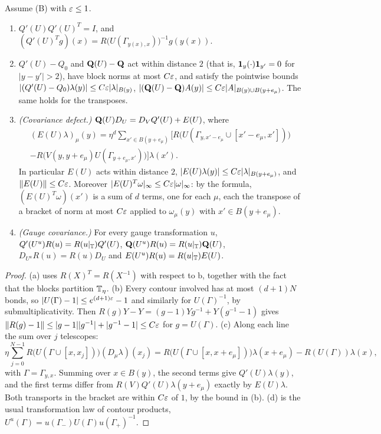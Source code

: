 \begin{lemma}\label{lem:cov-avg}
Assume (B) with $\varepsilon\le1$.
\begin{enumerate}[label=(\alph*)]
\item $Q'(U)Q'(U)^T=I$, and $(Q'(U)^Tg)(x)=R\big(U(\Gamma_{y(x),x})\big)^{-1}g(y(x))$.
\item $Q'(U)-Q_0$ and $\mathbf Q(U)-\mathbf Q$ act within distance $2$ (that is, $\mathbf 1_y(\cdot)\mathbf 1_{y'}=0$ for $|y-y'|>2$), have block norms at most $C\varepsilon$, and satisfy the pointwise bounds $|(Q'(U)-Q_0)\lambda(y)|\le C\varepsilon|\lambda|_{B(y)}$, $|(\mathbf Q(U)-\mathbf Q)A(y)|\le C\varepsilon|A|_{B(y)\cup B(y+e_\mu)}$. The same holds for the transposes.
\item \emph{(Covariance defect.)} $\mathbf Q(U)D_U=D_VQ'(U)+E(U)$, where
\begin{multline*}
(E(U)\lambda)_\mu(y)=\eta^d\sum_{x'\in B(y+e_\mu)}\Big[R\big(U(\Gamma_{y,x'-e_\mu}\cup[x'-e_\mu,x'])\big)\\
-R\big(V(y,y+e_\mu)U(\Gamma_{y+e_\mu,x'})\big)\Big]\lambda(x').
\end{multline*}
In particular $E(U)$ acts within distance $2$, $|E(U)\lambda(y)|\le C\varepsilon|\lambda|_{B(y+e_\mu)}$, and $\|E(U)\|\le C\varepsilon$. Moreover $|E(U)^T\omega|_\infty\le C\varepsilon|\omega|_\infty$: by the formula, $(E(U)^T\omega)(x')$ is a sum of $d$ terms, one for each $\mu$, each the transpose of a bracket of norm at most $C\varepsilon$ applied to $\omega_\mu(y)$ with $x'\in B(y+e_\mu)$.
\item \emph{(Gauge covariance.)} For every gauge transformation $u$, $Q'(U^u)R(u)=R(u|_\mathbb T)Q'(U)$, $\mathbf Q(U^u)R(u)=R(u|_\mathbb T)\mathbf Q(U)$, $D_{U^u}R(u)=R(u)D_U$ and $E(U^u)R(u)=R(u|_\mathbb T)E(U)$.
\end{enumerate}
\end{lemma}

\begin{proof}
(a) uses $R(X)^T=R(X^{-1})$ with respect to $\mathrm b$, together with the fact that the blocks partition $\mathbb T_\eta$. (b) Every contour involved has at most $(d+1)N$ bonds, so $|U(\Gamma)-1|\le e^{(d+1)\varepsilon}-1$ and similarly for $U(\Gamma)^{-1}$, by submultiplicativity. Then $R(g)Y-Y=(g-1)Yg^{-1}+Y(g^{-1}-1)$ gives $\|R(g)-1\|\le|g-1||g^{-1}|+|g^{-1}-1|\le C\varepsilon$ for $g=U(\Gamma)$. (c) Along each line the sum over $j$ telescopes:
\[
\eta\sum_{j=0}^{N-1}R\big(U(\Gamma\cup[x,x_j])\big)(D_\mu\lambda)(x_j)=R\big(U(\Gamma\cup[x,x+e_\mu])\big)\lambda(x+e_\mu)-R(U(\Gamma))\lambda(x),
\]
with $\Gamma=\Gamma_{y,x}$. Summing over $x\in B(y)$, the second terms give $Q'(U)\lambda(y)$, and the first terms differ from $R(V)Q'(U)\lambda(y+e_\mu)$ exactly by $E(U)\lambda$. Both transports in the bracket are within $C\varepsilon$ of $1$, by the bound in (b). (d) is the usual transformation law of contour products, $U^u(\Gamma)=u(\Gamma_-)U(\Gamma)u(\Gamma_+)^{-1}$.
\end{proof}

